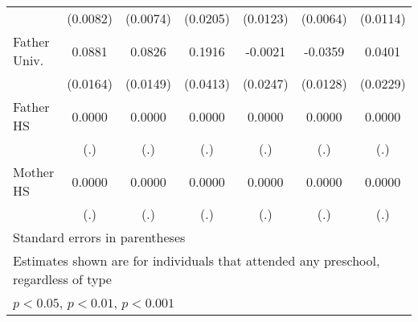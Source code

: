 \begin{table}[htbp]
\begin{tabular}{l*{6}{c}}
            &    (0.0082)         &    (0.0074)         &    (0.0205)         &    (0.0123)         &    (0.0064)         &    (0.0114)         \\
\addlinespace
Father Univ.&      0.0881\sym{***}&      0.0826\sym{***}&      0.1916\sym{***}&     -0.0021         &     -0.0359\sym{**} &      0.0401         \\
            &    (0.0164)         &    (0.0149)         &    (0.0413)         &    (0.0247)         &    (0.0128)         &    (0.0229)         \\
\addlinespace
Father HS   &      0.0000         &      0.0000         &      0.0000         &      0.0000         &      0.0000         &      0.0000         \\
            &         (.)         &         (.)         &         (.)         &         (.)         &         (.)         &         (.)         \\
\addlinespace
Mother HS   &      0.0000         &      0.0000         &      0.0000         &      0.0000         &      0.0000         &      0.0000         \\
            &         (.)         &         (.)         &         (.)         &         (.)         &         (.)         &         (.)         \\
\bottomrule
\multicolumn{7}{l}{\footnotesize Standard errors in parentheses}\\
\multicolumn{7}{l}{\footnotesize Estimates shown are for individuals that attended any preschool, regardless of type}\\
\multicolumn{7}{l}{\footnotesize \sym{*} \(p<0.05\), \sym{**} \(p<0.01\), \sym{***} \(p<0.001\)}\\
\end{tabular}
\end{table}
